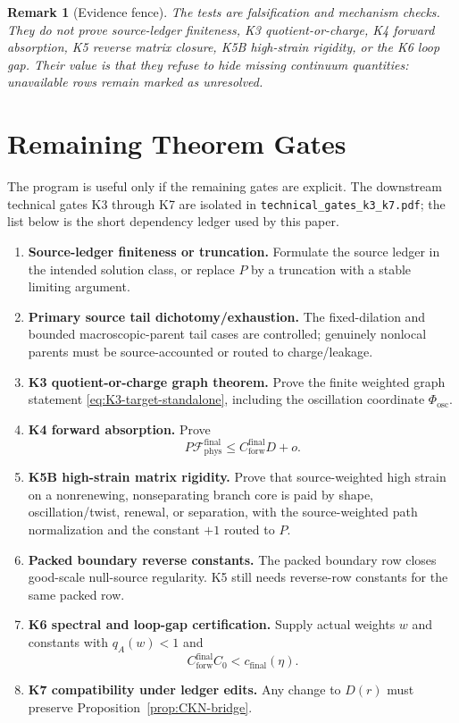 \documentclass[11pt]{article}
\newtheorem{remark}{Remark}
\begin{document}
\begin{remark}[Evidence fence]
The tests are falsification and mechanism checks.  They do not prove
source-ledger finiteness, K3 quotient-or-charge, K4 forward absorption, K5
reverse matrix closure, K5B high-strain rigidity, or the K6 loop gap.  Their
value is that they refuse to hide missing continuum quantities: unavailable
rows remain marked as unresolved.
\end{remark}

\clearpage
\section{Remaining Theorem Gates}
\label{sec:gates}

The program is useful only if the remaining gates are explicit.  The downstream
technical gates K3 through K7 are isolated in
\texttt{technical\_gates\_k3\_k7.pdf}; the list below is the short dependency
ledger used by this paper.
\begin{enumerate}
\item \textbf{Source-ledger finiteness or truncation.}  Formulate the source
ledger in the intended solution class, or replace \(P\) by a truncation with a
stable limiting argument.

\item \textbf{Primary source tail dichotomy/exhaustion.}  The fixed-dilation
and bounded macroscopic-parent tail cases are controlled; genuinely nonlocal
parents must be source-accounted or routed to charge/leakage.

\item \textbf{K3 quotient-or-charge graph theorem.}  Prove the finite weighted
graph statement \eqref{eq:K3-target-standalone}, including the oscillation
coordinate \(\Phi_{\mathrm{osc}}\).

\item \textbf{K4 forward absorption.}  Prove
\[
P\mathcal F_{\mathrm{phys}}^{\mathrm{final}}
\le C_{\mathrm{forw}}^{\mathrm{final}}D+o.
\]

\item \textbf{K5B high-strain matrix rigidity.}  Prove that source-weighted
high strain on a nonrenewing, nonseparating branch core is paid by shape,
oscillation/twist, renewal, or separation, with the source-weighted path
normalization and the constant \(+1\) routed to \(P\).

\item \textbf{Packed boundary reverse constants.}  The packed boundary row
closes good-scale null-source regularity.  K5 still needs reverse-row constants
for the same packed row.

\item \textbf{K6 spectral and loop-gap certification.}  Supply actual weights
\(w\) and constants with \(q_A(w)<1\) and
\[
C_{\mathrm{forw}}^{\mathrm{final}}C_0<c_{\mathrm{final}}(\eta).
\]

\item \textbf{K7 compatibility under ledger edits.}  Any change to \(D(r)\)
must preserve Proposition~\ref{prop:CKN-bridge}.
\end{enumerate}
\end{document}
